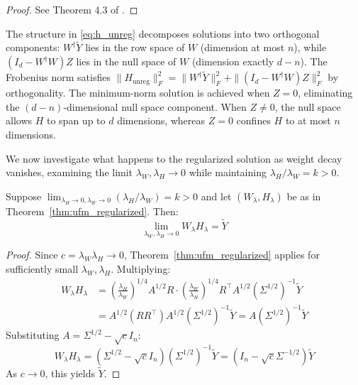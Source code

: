 \begin{proof}
See Theorem 4.3 of \citet{andriopoulos2024prevalence}.
\end{proof}

The structure in \eqref{eq:h_unreg} decomposes solutions into two orthogonal components: $W^\dagger \tilde{Y}$ lies in the row space of $W$ (dimension at most $n$), while $(I_d - W^\dagger W)Z$ lies in the null space of $W$ (dimension exactly $d - n$). The Frobenius norm satisfies $\|H_{\text{unreg}}\|_F^2 = \|W^\dagger \tilde{Y}\|_F^2 + \|(I_d - W^\dagger W)Z\|_F^2$ by orthogonality. The minimum-norm solution is achieved when $Z = 0$, eliminating the $(d-n)$-dimensional null space component. When $Z \neq 0$, the null space allows $H$ to span up to $d$ dimensions, whereas $Z = 0$ confines $H$ to at most $n$ dimensions.

We now investigate what happens to the regularized solution as weight decay vanishes, examining the limit $\lambda_W, \lambda_H \to 0$ while maintaining $\lambda_H / \lambda_W = k > 0$.

\begin{lemma}
\label{lem:reconstruction_limit}
Suppose $\lim_{\lambda_H \to 0, \lambda_W \to 0}(\lambda_H/\lambda_W) = k > 0$ and let $(W_\lambda, H_\lambda)$ be as in Theorem~\ref{thm:ufm_regularized}. Then:
\begin{equation}
\lim_{\lambda_W, \lambda_H \to 0} W_\lambda H_\lambda = \tilde{Y}
\end{equation}
\end{lemma}

\begin{proof}
Since $c = \lambda_W \lambda_H \to 0$, Theorem~\ref{thm:ufm_regularized} applies for sufficiently small $\lambda_W, \lambda_H$. Multiplying:
\begin{align}
W_\lambda H_\lambda &= \left(\frac{\lambda_H}{\lambda_W}\right)^{1/4} A^{1/2} R \cdot \left(\frac{\lambda_W}{\lambda_H}\right)^{1/4} R^\top A^{1/2} (\Sigma^{1/2})^{-1} \tilde{Y}\\
&= A^{1/2} (RR^\top) A^{1/2} (\Sigma^{1/2})^{-1} \tilde{Y} = A (\Sigma^{1/2})^{-1} \tilde{Y}
\end{align}
Substituting $A = \Sigma^{1/2} - \sqrt{c}I_n$:
\begin{equation}
W_\lambda H_\lambda = (\Sigma^{1/2} - \sqrt{c}I_n)(\Sigma^{1/2})^{-1}\tilde{Y} = (I_n - \sqrt{c}\Sigma^{-1/2})\tilde{Y}
\end{equation}
As $c \to 0$, this yields $\tilde{Y}$.
\end{proof}

